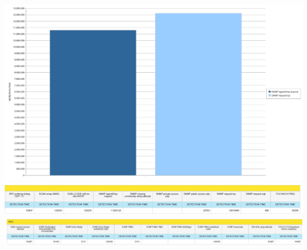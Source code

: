 \includegraphics[scale=0.3]{figure/detection_SNMP.jpg}\\

\includegraphics[scale=0.25]{figure/tabella_detection_msg_2.jpg}\\

\includegraphics[scale=0.25]{figure/tabella_detection_msg_1.jpg}

